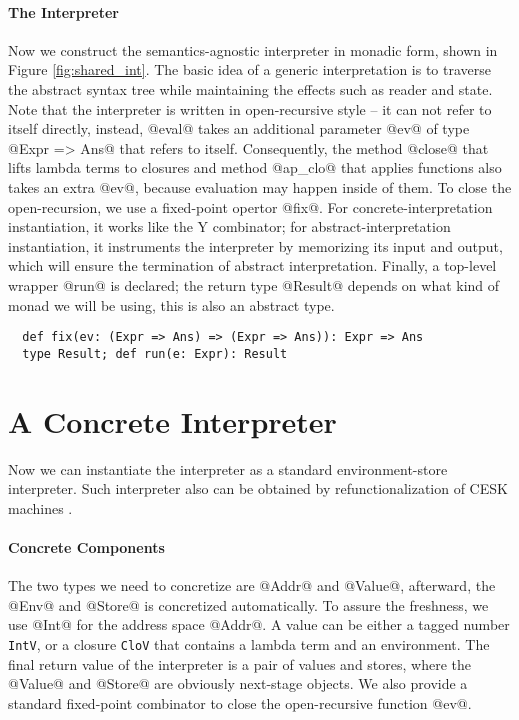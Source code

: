 \paragraph{The Interpreter} Now we construct the semantics-agnostic interpreter
in monadic form, shown in Figure \ref{fig:shared_int}. The basic idea
of a generic interpretation is to traverse the abstract syntax tree
while maintaining the effects such as reader and state.  Note that the
interpreter is written in open-recursive style -- it can not refer to
itself directly, instead, @eval@ takes an additional parameter @ev@ of
type @Expr => Ans@ that refers to itself. Consequently, the method
@close@ that lifts lambda terms to closures and method @ap_clo@ that
applies functions also takes an extra @ev@, because evaluation may
happen inside of them.
To close the open-recursion, we use a fixed-point opertor @fix@.
For concrete-interpretation instantiation, it works like the Y
combinator; for abstract-interpretation instantiation, it instruments
the interpreter by memorizing its input and output, which will ensure
the termination of abstract interpretation.
Finally, a top-level wrapper @run@ is declared; the return type
@Result@ depends on what kind of monad we will be using, this is also
an abstract type.


\begin{lstlisting}
  def fix(ev: (Expr => Ans) => (Expr => Ans)): Expr => Ans
  type Result; def run(e: Expr): Result
\end{lstlisting}


\section{A Concrete Interpreter} \label{unstaged_conc}

Now we can instantiate the interpreter as a standard environment-store
interpreter. Such interpreter also can be obtained by refunctionalization of
CESK machines \cite{Felleisen:1987:CAH:41625.41654, DBLP:conf/ppdp/AgerBDM03}.

\paragraph{Concrete Components}
The two types we need to concretize are @Addr@ and @Value@, afterward, the @Env@
and @Store@ is concretized automatically. To assure the freshness, we use @Int@
for the address space @Addr@. A value can be either a tagged number
\texttt{IntV}, or a closure \texttt{CloV} that contains a lambda term and an
environment. The final return value of the interpreter is a pair of values and
stores, where the @Value@ and @Store@ are obviously next-stage objects. We also
provide a standard fixed-point combinator to close the open-recursive function @ev@.

